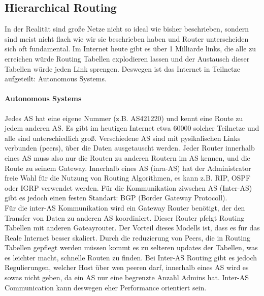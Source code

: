 	\subsection{Hierarchical Routing}
		In der Realität sind große Netze nicht so ideal wie bisher beschrieben, sondern sind meist nicht flach wie wir sie beschrieben haben und Router unterscheiden sich oft fundamental. Im Internet heute gibt es über 1 Milliarde links, die alle zu erreichen würde Routing Tabellen explodieren lassen und der Austausch dieser Tabellen würde jeden Link sprengen. Deswegen ist das Internet in Teilnetze aufgeteilt: Autonomous Systems. 

		\paragraph{Autonomous Systems}
			Jedes AS hat eine eigene Nummer (z.B. AS421220) und kennt eine Route zu jedem anderen AS. Es gibt im heutigen Internet etwa 60000 solcher Teilnetze und alle sind unterschiedlich groß. Verschiedene AS sind mit pysikalischen Links verbunden (peers), über die Daten ausgetauscht werden. Jeder Router innerhalb eines AS muss also nur die Routen zu anderen Routern im AS kennen, und die Route zu seinem Gateway. Innerhalb eines AS (inra-AS) hat der Administrator freie Wahl für die Nutzung von Routing Algorithmen, es kann z.B. RIP, OSPF oder IGRP verwendet werden. Für die Kommunikation ziwschen AS (Inter-AS) gibt es jedoch einen festen Standart: BGP (Border Gateway Protocoll). \\
			Für die inter-AS Kommunikation wird ein Gateway Router benötigt, der den Transfer von Daten zu anderen AS koordiniert. Dieser Router pfelgt Routing Tabellen mit anderen Gateayrouter. Der Vorteil dieses Modells ist, dass es für das Reale Internet besser skaliert. Durch die reduzierung von Peers, die in Routing Tabellen gepflegt werden müssen kommt es zu selteren updates der Tabellen, was es leichter macht, schnelle Routen zu finden. Bei Inter-AS Routing gibt es jedoch Regulierungen, welcher Host über wen peeren darf, innerhalb eines AS wird es sowas nicht geben, da ein AS nur eine begrenzte Anzahl Admins hat. Inter-AS Communication kann deswegen eher Performance orientiert sein. 

